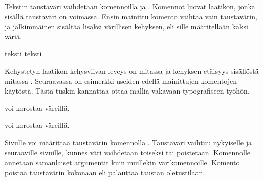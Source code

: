 \noindent
Tekstin taustaväri vaihdetaan komennoilla  ja
. Komennot luovat laatikon, jonka sisällä taustaväri
on voimassa. Ensin mainittu komento vaihtaa vain taustavärin, ja
jälkimmäinen sisältää lisäksi värillisen kehyksen, eli sille
määritellään kaksi väriä.

\begin{koodilohkosis}
\colorbox{nimi}{teksti} %
\colorbox[värimalli]{parametrit}{teksti}
\end{koodilohkosis}

\noindent
Kehystetyn laatikon kehysviivan leveys on mitassa  ja
kehyksen etäisyys sisällöstä mitassa . Seuraavassa on
esimerkki useiden edellä mainittujen komentojen käytöstä. Tästä tuskin
kannattaa ottaa mallia vakavaan typografiseen työhön.

\begin{koodilohkosis}
\setlength{\fboxrule}{2bp} \setlength{\fboxsep}{1bp}
\textcolor{pun}{voi korostaa} \colorbox{pun}{väreillä}.
\end{koodilohkosis}

\begin{tulossis}
  \setlength{\fboxrule}{2bp} \setlength{\fboxsep}{1bp}
  \textcolor{pun}{voi korostaa} \colorbox{pun}{väreillä}.
\end{tulossis}

\noindent
Sivulle voi määrittää taustavärin komennolla .
Taustäväri vaihtuu nykyiselle ja seuraaville sivuille, kunnes väri
vaihdetaan toiseksi tai poistetaan. Komennolle annetaan samanlaiset
argumentit kuin muillekin värikomennoille. Komento
 poistaa taustavärin kokonaan eli palauttaa
taustan oletustilaan.

\begin{koodilohkosis}
\pagecolor{nimi} %
\pagecolor[värimalli]{parametrit}
\nopagecolor
\end{koodilohkosis}

